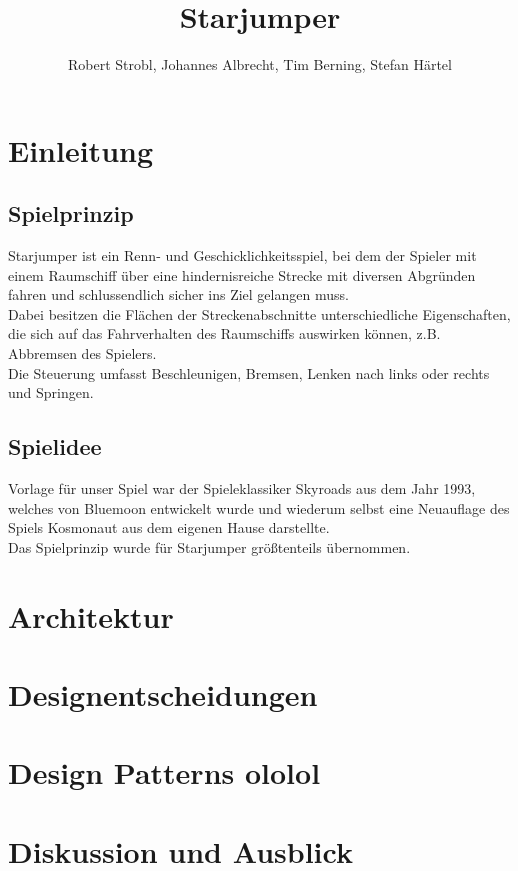 


\title{Starjumper}
\author{Robert Strobl, Johannes Albrecht, Tim Berning, Stefan H\"artel}

\maketitle

\section{Einleitung}
\subsection{Spielprinzip}
Starjumper ist ein Renn- und Geschicklichkeitsspiel, bei dem der Spieler mit einem
Raumschiff \"uber eine hindernisreiche Strecke mit diversen Abgr\"unden fahren und
schlussendlich sicher ins Ziel gelangen muss.\\
Dabei besitzen die Fl\"achen der Streckenabschnitte unterschiedliche Eigenschaften,
die sich auf das Fahrverhalten des Raumschiffs auswirken k\"onnen, z.B. Abbremsen
des Spielers.\\
Die Steuerung umfasst Beschleunigen, Bremsen, Lenken nach links oder rechts und
Springen.

\subsection{Spielidee}
Vorlage f\"ur unser Spiel war der Spieleklassiker Skyroads aus dem Jahr 1993, welches
von Bluemoon entwickelt wurde und wiederum selbst eine Neuauflage des Spiels Kosmonaut
aus dem eigenen Hause darstellte.\\
Das Spielprinzip wurde f\"ur Starjumper gr\"o\ss tenteils \"ubernommen.


\section{Architektur}

\section{Designentscheidungen}

\section{Design Patterns ololol}

\section{Diskussion und Ausblick}

